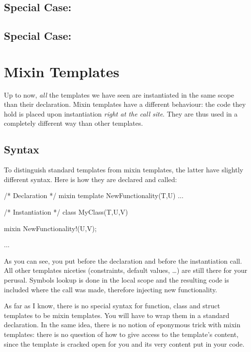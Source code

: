 \subsection{Special Case: }

\subsection{Special Case: }

\section{Mixin Templates}\label{mixintemplates}

Up to now, \emph{all} the templates we have seen are instantiated in the same scope than their declaration. Mixin templates have a different behaviour: the code they hold is placed upon instantiation \emph{right at the call site}. They are thus used in a completely different way than other templates.

\subsection{Syntax}\label{mixintemplatessyntax}

To distinguish standard templates from mixin templates, the latter have slightly different syntax. Here is how they are declared and called:

\begin{dcode}
/* Declaration */
mixin template NewFunctionality(T,U) { ... }


/* Instantiation */
class MyClass(T,U,V)
{
    mixin NewFunctionality!(U,V);

    ...
}
\end{dcode}

As you can see, you put  before the declaration and  before the instantiation call. All other templates niceties (constraints, default values, \ldots) are still there for your perusal. Symbols lookup is done in the local scope and the resulting code is included where the call was made, therefore injecting new functionality.

As far as I know, there is no special syntax for function, class and struct templates to be mixin templates. You will have to wrap them in a standard  declaration. In the same idea, there is no notion of eponymous trick with mixin templates: there is no question of how to give access to the template's content, since the template is cracked open for you and its very content put in your code.


